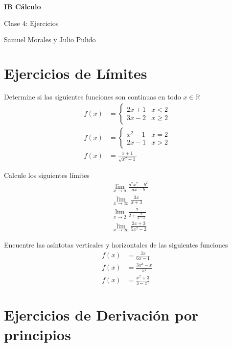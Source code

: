\documentclass[spanish,12pt]{article}
\begin{document}
	\begin{titlepage}
	\begin{center}
	\hspace{0pt}
	\vfill
	{\Large\textbf{{IB Cálculo}}}
	
	\medskip
	Clase 4: Ejercicios
	
	\medskip
    Samuel Morales y Julio Pulido
	
	\thispagestyle{empty}
	\vfill
	\end{center}
	\end{titlepage}
\newpage
\tableofcontents
\newpage
\section{Ejercicios de Límites}

Determine si las siguientes funciones son continuas en todo $x \in \mathbb{R}$
\begin{align*}
    f(x) &=\begin{cases} 
      2x+1 & x<2 \\
    3x-2 & x\geq2
   \end{cases}\\
   f(x) &=\begin{cases} 
      x^2-1 & x=2 \\
    2x-1 & x>2
   \end{cases}\\
   f(x)&= \frac{x+1}{\sqrt{x^2+1}}
\end{align*}

Calcule los siguientes límites
\begin{align*}
    &\lim_{x\to a} \frac{a^2x^2-b^2}{ax-b}\\
    &\lim_{x\to \infty}\frac{3x}{x+3}\\
    &\lim_{x\to 2} \frac{2}{2+\frac{2}{2-x}}\\
    &\lim_{x\to \infty} \frac{2x+3}{5x^2-2}
\end{align*}

Encuentre las asíntotas verticales y horizontales de las siguientes funciones
\begin{align*}
    f(x)&=\frac{3x}{6x-1}\\
    f(x)&=\frac{3x^3-x}{x^2}\\
    f(x)&=\frac{x^2+3}{3-x^2}
\end{align*}

\section{Ejercicios de Derivación por principios}
\end{document}
